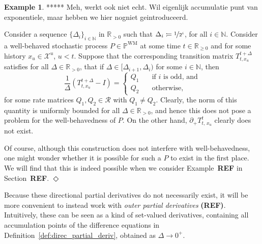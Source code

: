 \documentclass[10pt]{paper}
\theoremstyle{definition}
\newtheorem{exmp}{Example}%
\newcommand{\nats}{\mathbb{N}}
\newcommand{\reals}{\mathbb{R}}
\newcommand{\realspos}{\reals_{>0}}
\newcommand{\realsnonneg}{\reals_{\geq 0}}
\newcommand{\states}{\mathcal{X}}
\newcommand{\processes}{\mathbb{P}}
\newcommand{\wmprocesses}{\processes^{\mathrm{WM}}}
\newcommand{\coloneqq}{:\!=}
\newcommand{\exampleend}{\hfill$\Diamond$}
\begin{document}
\begin{exmp}\label{exmp:well-behaved-no-deriv}
***** Meh, werkt ook niet echt. Wil eigenlijk accumulatie punt van exponentiele, maar hebben we hier nogniet geintroduceerd.

Consider a sequence $\{\Delta_i\}_{i\in\nats}$ in $\realspos$ such that $\Delta_i\coloneqq \nicefrac{1}{2^i}$, for all $i\in\nats$. Consider a well-behaved stochastic process $P\in\wmprocesses$ at some time $t\in\realsnonneg$ and for some history $x_u\in\states^u$, $u<t$. Suppose that the corresponding transition matrix $T_{t,x_u}^{t+\Delta}$ satisfies for all $\Delta\in\realspos$, that if $\Delta\in[\Delta_{i+1},\Delta_i)$ for some $i\in\nats$, then
\begin{equation*}
\frac{1}{\Delta}(T_{t,x_u}^{t+\Delta} - I) = \left\{\begin{array}{cl}
Q_1 & \quad \text{if $i$ is odd, and} \\
Q_2 & \quad \text{otherwise,}
\end{array}\right.
\end{equation*}
for some rate matrices $Q_1,Q_2\in\mathcal{R}$ with $Q_1\neq Q_2$. Clearly, the norm of this quantity is uniformly bounded for all $\Delta\in\realspos$, and hence this does not pose a problem for the well-behavedness of $P$. On the other hand, $\partial_{+}{T_{t,\,x_u}^t}$ clearly does not exist.

Of course, although this construction does not interfere with well-behavedness, one might wonder whether it is possible for such a $P$ to exist in the first place. We will find that this is indeed possible when we consider Example~{\bf REF} in Section~{\bf REF}.
\exampleend
\end{exmp}

Because these directional partial derivatives do not necessarily exist, it will be more convenient to instead work with \emph{outer partial derivatives} {\bf (REF)}. Intuitively, these can be seen as a kind of set-valued derivatives, containing all accumulation points of the difference equations in Definition~\ref{def:direc_partial_deriv}, obtained as $\Delta\to0^+$.
\end{document}
